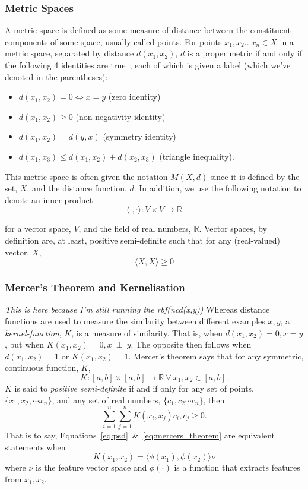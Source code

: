 \documentclass[conference]{IEEEtran}
\newcommand{\cm}[1]{\textit{{\color{blue}#1}}}
\begin{document}
\subsubsection{Metric Spaces}

A metric space is defined as some measure of distance between the constituent components of some space, usually called points.  For points $x_1,x_2...x_n \in X$ in a metric space, separated by distance $d(x_1,x_2)$, $d$ is a proper metric if and only if the following 4 identities are true~\cite{metrics}, each of which is given a label (which we've denoted in the parentheses):

\label{metric_spaces}
\begin{itemize}
    \item $d(x_1,x_2) = 0 \iff x = y$ (zero identity)
    \item $d(x_1,x_2) \geq 0$ (non-negativity identity)
    \item $d(x_1,x_2) = d(y, x)$ (symmetry identity)
    \item $d(x_1, x_3) \leq d(x_1,x_2) + d(x_2,x_3)$ (triangle inequality).
\end{itemize}
This metric space is often given the notation $M(X,d)$ since it is defined by the set, $X$, and the distance function, $d$.
In addition, we use the following notation to denote an inner product
$$
\langle \cdot , \cdot \rangle : V \times V \rightarrow \mathbb{R}
$$

for a vector space, $V$, and the field of real numbers, $\mathbb{R}$. 
Vector spaces, by definition are, at least, positive semi-definite such that for any (real-valued) vector, $X$, 
\begin{equation}
\langle X, X \rangle \geq 0
\label{eq:psd}
\end{equation}

\subsubsection{Mercer's Theorem and Kernelisation}
\cm{This is here because I'm still running the rbf(ncd(x,y))}
Whereas distance functions are used to measure the similarity between different examples $x,y$, a \textit{kernel-function}, $K$, is a measure of similarity. That is, when $d(x_1,x_2) = 0, x = y$ , but when $K(x_1,x_2) = 0, x~\perp~y$. The opposite then follows when $d(x_1,x_2)=1$ or $K(x_1,x_2)=1$. Mercer's theorem says that for any symmetric, continuous function, $K$,
$$
K : [a, b] \times [a, b] \rightarrow \mathbb{R}~\forall~x_1,x_2 \in [a,b].
$$
$K$ is said to \textit{positive semi-definite} if and if only for any set of points, $\{x_1, x_2, \cdots x_n\}$, and any set of real numbers, $\{ c_1, c_2 \cdots c_n\}$, then
\begin{equation}
\sum_{i=1}^n \sum_{j=1}^n K(x_i, x_j) c_i, c_j \geq 0.
\label{eq:mercers_theorem}
\end{equation}
That is to say, Equations~\ref{eq:psd}~\&~\ref{eq:mercers_theorem} are equivalent statements when 
$$
K(x_1, x_2) = \langle \phi(x_1), \phi(x_2) \rangle \nu
$$
where $\nu$ is the feature vector space and $\phi(\cdot)$ is a function that extracts features from $x_1,x_2$.
\end{document}

